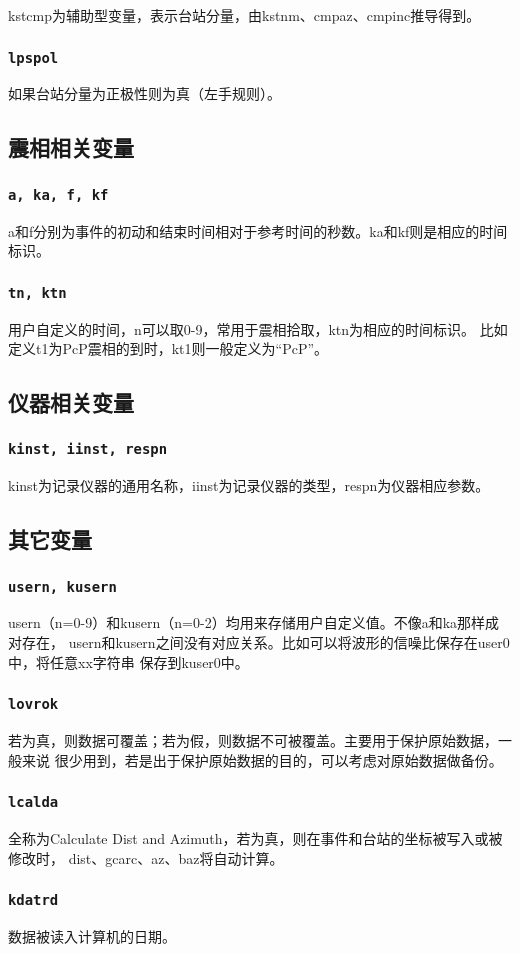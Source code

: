 kstcmp为辅助型变量，表示台站分量，由kstnm、cmpaz、cmpinc推导得到。

\subsubsection{\texttt{lpspol}}
如果台站分量为正极性则为真（左手规则）。

\subsection{震相相关变量}
\subsubsection{\texttt{a, ka, f, kf}}
a和f分别为事件的初动和结束时间相对于参考时间的秒数。ka和kf则是相应的时间标识。

\subsubsection{\texttt{tn, ktn}}
用户自定义的时间，n可以取0-9，常用于震相拾取，ktn为相应的时间标识。
比如定义t1为PcP震相的到时，kt1则一般定义为``PcP''。

\subsection{仪器相关变量}
\subsubsection{\texttt{kinst, iinst\dag, respn\dag}}
kinst为记录仪器的通用名称，iinst为记录仪器的类型，respn为仪器相应参数。

\subsection{其它变量}
\subsubsection{\texttt{usern, kusern}}
usern（n=0-9）和kusern（n=0-2）均用来存储用户自定义值。不像a和ka那样成对存在，
usern和kusern之间没有对应关系。比如可以将波形的信噪比保存在user0中，将任意xx字符串
保存到kuser0中。

\subsubsection{\texttt{lovrok}}
若为真，则数据可覆盖；若为假，则数据不可被覆盖。主要用于保护原始数据，一般来说
很少用到，若是出于保护原始数据的目的，可以考虑对原始数据做备份。

\subsubsection{\texttt{lcalda}}
全称为Calculate Dist and Azimuth，若为真，则在事件和台站的坐标被写入或被修改时，
dist、gcarc、az、baz将自动计算。

\subsubsection{\texttt{kdatrd}}
数据被读入计算机的日期。
